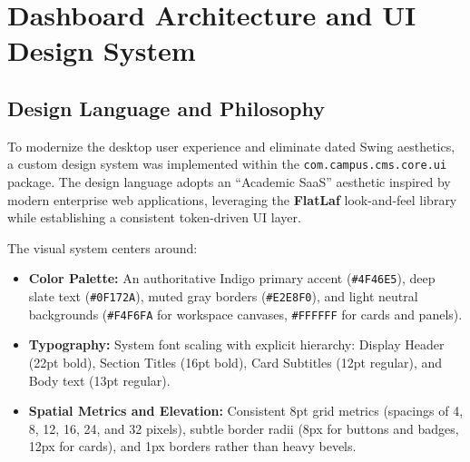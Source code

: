 \section{Dashboard Architecture and UI Design System}
\label{sec:ui-design-system}

\subsection{Design Language and Philosophy}
To modernize the desktop user experience and eliminate dated Swing aesthetics, a custom design system was implemented within the \texttt{com.campus.cms.core.ui} package. The design language adopts an ``Academic SaaS'' aesthetic inspired by modern enterprise web applications, leveraging the \textbf{FlatLaf} look-and-feel library while establishing a consistent token-driven UI layer.

The visual system centers around:
\begin{itemize}
    \item \textbf{Color Palette:} An authoritative Indigo primary accent (\texttt{\#4F46E5}), deep slate text (\texttt{\#0F172A}), muted gray borders (\texttt{\#E2E8F0}), and light neutral backgrounds (\texttt{\#F4F6FA} for workspace canvases, \texttt{\#FFFFFF} for cards and panels).
    \item \textbf{Typography:} System font scaling with explicit hierarchy: Display Header (22pt bold), Section Titles (16pt bold), Card Subtitles (12pt regular), and Body text (13pt regular).
    \item \textbf{Spatial Metrics and Elevation:} Consistent 8pt grid metrics (spacings of 4, 8, 12, 16, 24, and 32 pixels), subtle border radii (8px for buttons and badges, 12px for cards), and 1px borders rather than heavy bevels.
\end{itemize}


